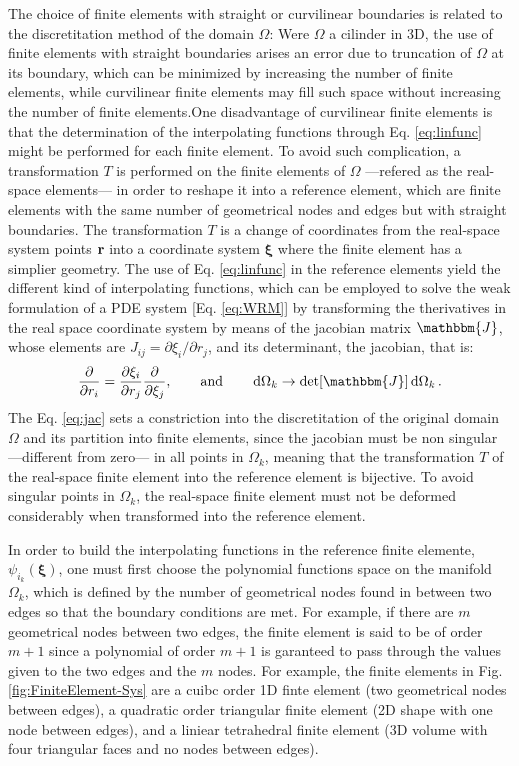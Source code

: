      The choice of finite elements with straight or curvilinear boundaries is related to the discretitation method of the domain $\Omega$: Were $\Omega$ a cilinder in 3D, the use of finite elements with straight boundaries arises an error due to truncation of $\Omega$ at its boundary, which can be minimized by increasing the number of finite elements, while curvilinear finite elements may fill such space without increasing the number of finite elements.One disadvantage of curvilinear finite elements is that the determination of the interpolating functions through Eq. \eqref{eq:linfunc} might be performed for each finite element. To avoid such complication, a transformation $T$ is performed on the finite elements of $\Omega$ ---refered as the real-space elements--- in order to reshape it into a reference element, which are finite elements with the same number of geometrical nodes and edges but with straight boundaries. The transformation $T$ is a change of coordinates from the real-space system points $\vb{r}$ into a coordinate system $\boldsymbol{\xi}$ where the finite element has a simplier geometry. The use of Eq. \eqref{eq:linfunc} in the reference elements yield the different kind of interpolating functions, which can be employed to solve the weak formulation of a PDE system [Eq. \eqref{eq:WRM}] by transforming the therivatives in the real space coordinate system by means of the jacobian matrix $\mathbbm{J}$, whose elements are $J_{ij} = \partial \xi_i/\partial r_j$, and its determinant, the jacobian, that is:
    \begin{align}
        \pdv{r_i} = \pdv{\xi_i}{r_j} \pdv{\xi_j},
        \qquad
        \text{and}
        \qquad
        \dd{\Omega_k} \to \det[\mathbbm{J}]\dd{\Omega_k}.
    \label{eq:jac}
    \end{align}
     The Eq. \eqref{eq:jac} sets a constriction into the discretitation of the original domain $\Omega$ and its partition into finite elements, since the jacobian must be non singular ---different from zero--- in all points in $\Omega_k$, meaning that the transformation $T$ of the real-space finite element into the reference element is bijective. To avoid singular points in $\Omega_k$, the real-space finite element must not be deformed considerably when transformed into the reference element.

     In order to build the interpolating functions in the reference finite elemente, $\psi_{i_k}(\boldsymbol{\xi})$, one must  first choose the polynomial functions space on the manifold $\Omega_k$, which is defined by the number of geometrical nodes found in between two edges so that the boundary conditions are met. For example, if there are $m$ geometrical nodes between two edges, the finite element is said to be of order $m+1$ since a polynomial of order $m+1$ is garanteed to pass through the values given to  the two edges and the $m$ nodes. For example, the finite elements in Fig. \ref{fig:FiniteElement-Sys} are a cuibc order 1D finte element (two geometrical nodes between edges), a quadratic order triangular finite element (2D shape with one node between edges), and a liniear tetrahedral finite element (3D volume with four triangular faces and no nodes between edges).

